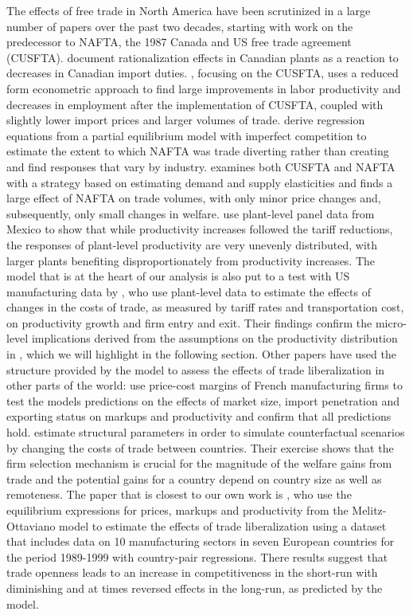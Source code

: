 \documentclass[a4paper,12pt]{article}
\begin{document}
The effects of free trade in North America have been scrutinized in a large number of papers over the past two decades, starting with work on the predecessor to NAFTA, the 1987 Canada and US free trade agreement (CUSFTA). \citet{Head1999} document rationalization effects in Canadian plants as a reaction to decreases in Canadian import duties. \citet{Trefler2004}, focusing on the CUSFTA, uses a reduced form econometric approach to find large improvements in labor productivity and decreases in employment after the implementation of CUSFTA, coupled with slightly lower import prices and larger volumes of trade. \citet*{Fukao2003} derive regression equations from a partial equilibrium model with imperfect competition to estimate the extent to which NAFTA was trade diverting rather than creating and find responses that vary by industry. \citet{Romalis2007} examines both CUSFTA and NAFTA with a strategy based on estimating demand and supply elasticities and finds a large effect of NAFTA on trade volumes, with only minor price changes and, subsequently, only small changes in welfare. \citet{Calderon-Madrid2007} use plant-level panel data from Mexico to show that while productivity increases followed the tariff reductions, the responses of plant-level productivity are very unevenly distributed, with larger plants benefiting disproportionately from productivity increases. The \citet{Melitz2003} model that is at the heart of our analysis is also put to a test with US manufacturing data by \citet*{Bernard2006a}, who use plant-level data to estimate the effects of changes in the costs of trade, as measured by tariff rates and transportation cost, on productivity growth and firm entry and exit. Their findings confirm the micro-level implications derived from the assumptions on the productivity distribution in \citet{Melitz2003}, which we will highlight in the following section. Other papers have used the structure provided by the \citet{MelitzOttaviano2008} model to assess the effects of trade liberalization in other parts of the world: \citet{Bellone2008} use price-cost margins of French manufacturing firms to test the models predictions on the effects of market size, import penetration and exporting status on markups and productivity and confirm that all predictions hold. \citet{Corcos2011} estimate structural parameters in order to simulate counterfactual scenarios by changing the costs of trade between countries. Their exercise shows that the firm selection mechanism is crucial for the magnitude of the welfare gains from trade and the potential gains for a country depend on country size as well as remoteness. The paper that is closest to our own work is \citet{Chen2009}, who use the equilibrium expressions for prices, markups and productivity from the Melitz-Ottaviano model to estimate the effects of trade liberalization using a dataset that includes data on 10 manufacturing sectors in seven European countries for the period 1989-1999 with country-pair regressions. There results suggest that trade openness leads to an increase in competitiveness in the short-run with diminishing and at times reversed effects in the long-run, as predicted by the model. 
\end{document}
